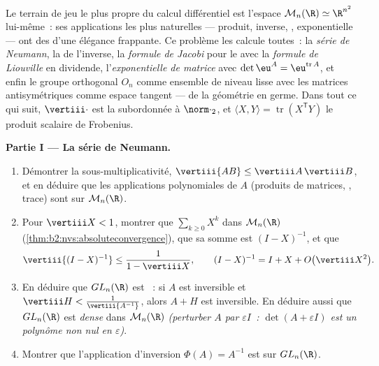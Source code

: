 \begin{problem}\label{pb:b2:diffcalc:1}
Le terrain de jeu le plus propre du calcul différentiel est l'espace
$\mathcal M_n(\R) \simeq \R^{n^2}$ lui-même~: ses applications les
plus naturelles --- produit, inverse, , exponentielle ---
ont des  d'une élégance frappante. Ce problème les
calcule toutes~: la \emph{série de Neumann}, la  de
l'inverse, la \emph{formule de Jacobi} pour
le  avec la \emph{formule de Liouville} en dividende,
l'\emph{exponentielle de matrice}
avec $\det\eu^A = \eu^{\operatorname{tr}A}$, et enfin le groupe
orthogonal $O_n$ comme ensemble de niveau lisse avec les matrices
antisymétriques comme espace tangent --- de la géométrie
 en germe. Dans tout ce qui suit, $\vertiii\cdot$ est
la  subordonnée à $\norm\cdot_2$, et $\langle X,
Y\rangle = \operatorname{tr}(X^{\mathsf T}Y)$ le produit scalaire de
Frobenius.

\medskip
\noindent\textbf{Partie I --- La série de Neumann.}
\begin{enumerate}
  \item Démontrer la sous-multiplicativité, $\vertiii{AB} \leq
        \vertiii A\,\vertiii B$, et en déduire que les applications
        polynomiales de $A$ (produits de matrices, ,
        trace) sont  sur $\mathcal M_n(\R)$.
  \item Pour $\vertiii X < 1$, montrer que $\sum_{k\geq0}X^k$
          dans $\mathcal M_n(\R)$
        (\cref{thm:b2:nvs:absoluteconvergence}), que sa somme
        est $(I - X)^{-1}$, et que
        \[
        \vertiii{(I - X)^{-1}} \leq \frac{1}{1 - \vertiii X},
        \qquad
        (I - X)^{-1} = I + X + O\bigl(\vertiii X^2\bigr) .
        \]
  \item En déduire que $GL_n(\R)$ est \emph{}~: si $A$ est
        inversible et $\vertiii H <
        \frac{1}{\vertiii{A^{-1}}}$, alors $A + H$ est
        inversible. En déduire aussi que $GL_n(\R)$ est \emph{dense}
        dans $\mathcal M_n(\R)$ \emph{(perturber $A$ par
        $\varepsilon I$~: $\det(A + \varepsilon I)$ est un polynôme
        non nul en $\varepsilon$)}.
  \item Montrer que l'application d'inversion $\Phi(A) = A^{-1}$ est
         sur $GL_n(\R)$.
\end{enumerate}


\end{problem}
